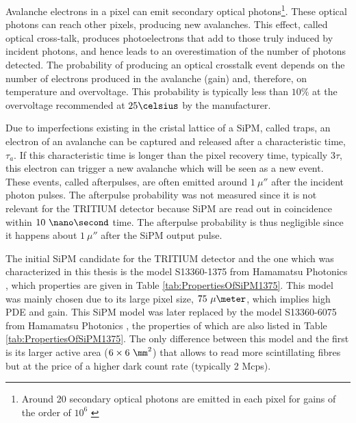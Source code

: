 Avalanche electrons in a pixel can emit secondary optical photons\footnote{Around 20 secondary optical photons are emitted in each pixel for gains of the order of $10^6$ \cite{CrosstalkProbability}}. These optical photons can reach other pixels, producing new avalanches. This effect, called optical cross-talk, produces photoelectrons that add to those truly induced by incident photons, and hence leads to an overestimation of the number of photons detected. The probability of producing an optical crosstalk event depends on the number of electrons produced in the avalanche (gain) and, therefore, on temperature and overvoltage. This probability is typically less than $10\%$ at the overvoltage recommended at $25\celsius$ by the manufacturer.


Due to imperfections existing in the cristal lattice of a SiPM, called traps, an electron of an avalanche can be captured and released after a characteristic time, $\tau_a$. If this characteristic time is longer than the pixel recovery time, typically $3\tau$, this electron can trigger a new avalanche which will be seen as a new event. These events, called  afterpulses, are often emitted around $1~\mu\second$ after the incident photon pulses. The afterpulse probability was not measured since it is not relevant for the TRITIUM detector because SiPM are read out in coincidence within $10~\nano\second$ time. The afterpulse probability is thus negligible since it happens about $1~\mu\second$ after the SiPM output pulse.

The initial SiPM candidate for the TRITIUM detector and the one which was characterized in this thesis is the model S13360-1375 from Hamamatsu Photonics \cite{DataSheetHammamatsu_1_SiPM_1375}, which properties are given in Table \ref{tab:PropertiesOfSiPM1375}. This model was mainly chosen due to its large pixel size, $75~\mu\meter$, which implies high PDE and gain. This SiPM model was later replaced by the model S13360-6075 from Hamamatsu Photonics \cite{DataSheetHammamatsu_1_SiPM_75}, the properties of which are also listed in Table \ref{tab:PropertiesOfSiPM1375}. The only difference between this model and the first is its larger active area ($6\times6~\mm^2$) that allows to read more scintillating fibres but at the price of a higher dark count rate (typically 2 Mcps). %

